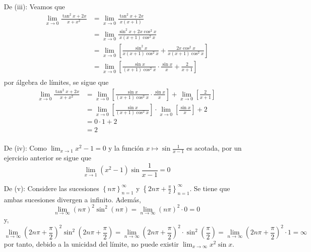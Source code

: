 \documentclass[12pt]{article}
\begin{document}
\begin{enumerate}
\begin{sol}
        De (iii): Veamos que
        \begin{equation*}
            \begin{split}
                \lim_{ x\rightarrow0}\frac{\tan^2x+2x}{x+x^2}&=\lim_{ x\rightarrow0}\frac{\tan^2x+2x}{x(x+1)}\\
                &=\lim_{ x\rightarrow0}\frac{\sin^2x+2x\cos^2 x}{x(x+1)\cos^2 x}\\
                &=\lim_{ x\rightarrow0}\left[\frac{\sin^2x}{x(x+1)\cos^2 x}+\frac{2x\cos^2 x}{x(x+1)\cos^2 x}\right] \\
                &=\lim_{ x\rightarrow0}\left[\frac{\sin x}{(x+1)\cos^2x}\cdot\frac{\sin x}{x}+\frac{2}{x+1}\right]\\
            \end{split}
        \end{equation*}
        por álgebra de límites, se sigue que
        \begin{equation*}
            \begin{split}
                \lim_{ x\rightarrow0}\frac{\tan^2x+2x}{x+x^2}&=\lim_{ x\rightarrow0}\left[\frac{\sin x}{(x+1)\cos^2x}\cdot\frac{\sin x}{x}\right]+\lim_{ x\rightarrow0}\left[\frac{2}{x+1}\right]\\
                &=\lim_{ x\rightarrow0}\left[\frac{\sin x}{(x+1)\cos^2x}\right]\cdot\lim_{ x\rightarrow0}\left[\frac{\sin x}{x}\right]+2\\
                &=0\cdot1+2\\
                &=2\\
            \end{split}
        \end{equation*}

        De (iv): Como $\lim_{ x\rightarrow 1}x^2-1=0$ y la función $x\mapsto\sin\frac{1}{x-1}$ es acotada, por un ejercicio anterior se sigue que
        \begin{equation*}
            \lim_{ x\rightarrow 1}(x^2-1)\sin\frac{1}{x-1}=0
        \end{equation*}

        De (v): Considere las sucesiones $\left\{n\pi \right\}_{ n=1}^\infty$ y $\left\{2n\pi+\frac{\pi}{2} \right\}_{ n=1}^\infty$. Se tiene que ambas sucesiones divergen a infinito. Además,
        \begin{equation*}
            \lim_{n\rightarrow\infty}(n\pi)^2\sin^2(n\pi)=\lim_{n\rightarrow\infty}(n\pi)^2\cdot 0=0
        \end{equation*}
        y,
        \begin{equation*}
            \lim_{n\rightarrow\infty}\left(2n\pi+\frac{\pi}{2}\right)^2\sin^2(2n\pi+\frac{\pi}{2})=\lim_{n\rightarrow\infty}\left(2n\pi+\frac{\pi}{2}\right)^2\cdot\sin^2(\frac{\pi}{2})=\lim_{n\rightarrow\infty}\left(2n\pi+\frac{\pi}{2}\right)^2\cdot1=\infty
        \end{equation*}
        por tanto, debido a la unicidad del límite, no puede existir $\lim_{ x\rightarrow\infty}x^2\sin x$.


\end{sol}
\end{enumerate}
\end{document}
